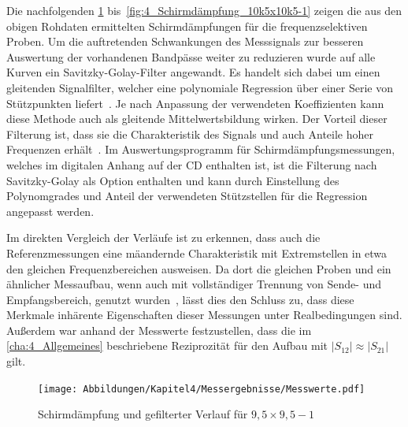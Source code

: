 


Die nachfolgenden \Abbildungen\ref{fig:4_Schirmdämpfung_9k5x9k5-1} bis~\ref{fig:4_Schirmdämpfung_10k5x10k5-1} zeigen die aus den obigen Rohdaten ermittelten Schirmdämpfungen für die frequenzselektiven Proben. Um die auftretenden Schwankungen des Messsignals zur besseren Auswertung der vorhandenen Bandpässe weiter zu reduzieren wurde auf alle Kurven ein Savitzky-Golay-Filter angewandt. Es handelt sich dabei um einen gleitenden Signalfilter, welcher eine polynomiale Regression über einer Serie von Stützpunkten liefert~\cite{Savitzky-Golay-Filter_Original}. Je nach Anpassung der verwendeten Koeffizienten kann diese Methode auch als gleitende Mittelwertsbildung wirken. Der Vorteil dieser Filterung ist, dass sie die Charakteristik des Signals und auch Anteile hoher Frequenzen erhält~\cite{Savitzky-Golay-Filter_Original}. Im Auswertungsprogramm für Schirmdämpfungsmessungen, welches im digitalen Anhang auf der CD enthalten ist, ist die Filterung nach Savitzky-Golay als Option enthalten und kann durch Einstellung des Polynomgrades und Anteil der verwendeten Stützstellen für die Regression angepasst werden.
\par
\vspace{\linespace}
Im direkten Vergleich der Verläufe ist zu erkennen, dass auch die Referenzmessungen eine mäandernde Charakteristik mit Extremstellen in etwa den gleichen Frequenzbereichen ausweisen. Da dort die gleichen Proben und ein ähnlicher Messaufbau, wenn auch mit vollständiger Trennung von Sende- und Empfangsbereich, genutzt wurden~\cite{FSS_Toedter_Diplomarbeit}, lässt dies den Schluss zu, dass diese Merkmale inhärente Eigenschaften dieser Messungen unter Realbedingungen sind. Außerdem war anhand der Messwerte festzustellen, dass die im \Abschnitt\ref{cha:4_Allgemeines} beschriebene Reziprozität für den Aufbau mit $|S_{12}| \approx |S_{21}|$ gilt.
\par
\vspace{\linespace}

\begin{figure}[H]
    \centering
    \texttt{[image: Abbildungen/Kapitel4/Messergebnisse/Messwerte.pdf]}
    \caption{Schirmdämpfung und gefilterter Verlauf für $9,5\times9,5-1$}
    \label{fig:4_Schirmdämpfung_9k5x9k5-1}
\end{figure}

